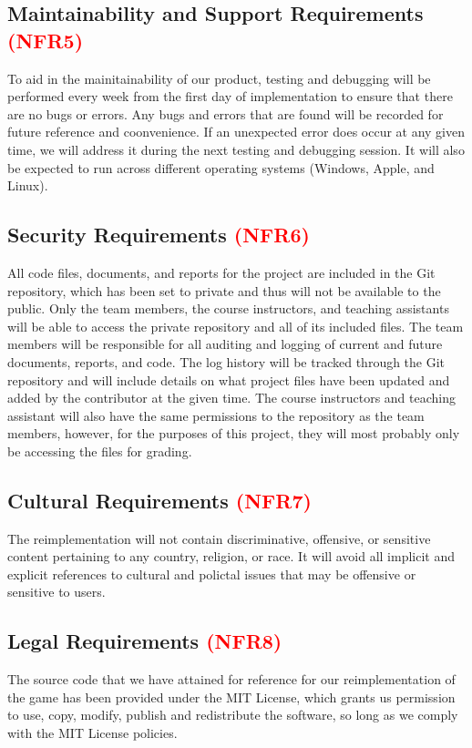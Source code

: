 \documentclass[12pt, titlepage]{article}
\begin{document}
\subsection{Maintainability and Support Requirements \textcolor{red}{(\textbf{NFR5})}\label{NFR5}}
To aid in the mainitainability of our product, testing and debugging will be performed every week from the first day of implementation to ensure that there are no bugs or errors. Any bugs and errors that are found will be recorded for future reference and coonvenience. If an unexpected error does occur at any given time, we will address it during the next testing and debugging session. It will also be expected to run across different operating systems (Windows, Apple, and Linux).

\subsection{Security Requirements \textcolor{red}{(\textbf{NFR6})}\label{NFR6}}
All code files, documents, and reports for the project are included in the Git repository, which has been set to private and thus will not be available to the public. Only the team members, the course instructors, and teaching assistants will be able to access the private repository and all of its included files. The team members will be responsible for all auditing and logging of current and future documents, reports, and code. The log history will be tracked through the Git repository and will include details on what project files have been updated and added by the contributor at the given time. The course instructors and teaching assistant will also have the same permissions to the repository as the team members, however, for the purposes of this project, they will most probably only be accessing the files for grading.

\subsection{Cultural Requirements \textcolor{red}{(\textbf{NFR7})}\label{NFR7}}
The reimplementation will not contain discriminative, offensive, or sensitive content pertaining to any country, religion, or race. It will avoid all implicit and explicit references to cultural and polictal issues that may be offensive or sensitive to users.

\subsection{Legal Requirements \textcolor{red}{(\textbf{NFR8})}\label{NFR8}}
The source code that we have attained for reference for our reimplementation of the game has been provided under the MIT License, which grants us permission to use, copy, modify, publish and redistribute the software, so long as we comply with the MIT License policies.
\end{document}
